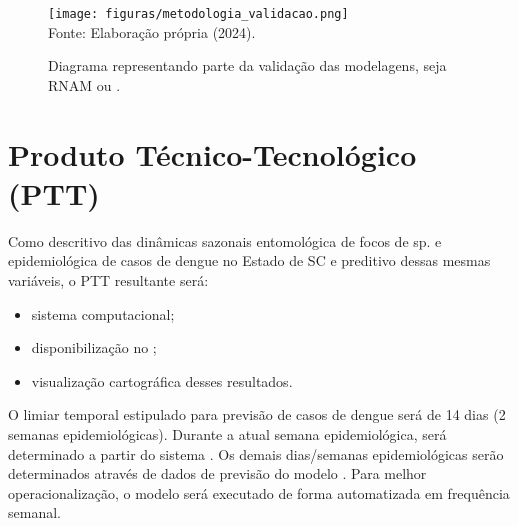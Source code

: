 \begin{figure}[htbp]
    \centering
    \caption{Diagrama representando parte da validação das modelagens, seja \acrshort{RNAM} ou .}
    \texttt{[image: figuras/metodologia\_validacao.png]}
    \label{fig: metodologia_validacao}
    \\
    \vspace{-0.05cm}\hspace{-6.5cm}\small{Fonte: Elaboração própria (2024).} 
\end{figure}




\section{Produto Técnico-Tecnológico (PTT)} 

\indent Como descritivo das dinâmicas sazonais entomológica de focos de  sp. e epidemiológica de casos de dengue no Estado de \acrlong{SC} e preditivo dessas mesmas variáveis, o \acrshort{PTT} resultante será:

\begin{itemize}
  \item sistema computacional;
  \item disponibilização  no ;
  \item visualização cartográfica desses resultados.
\end{itemize}


\indent O limiar temporal estipulado para previsão de casos de dengue será de 14 dias (2 semanas epidemiológicas). Durante a atual semana epidemiológica, será determinado a partir do sistema . Os demais dias/semanas epidemiológicas serão determinados através de dados de previsão do modelo . Para melhor operacionalização, o modelo será executado de forma automatizada em frequência semanal.


